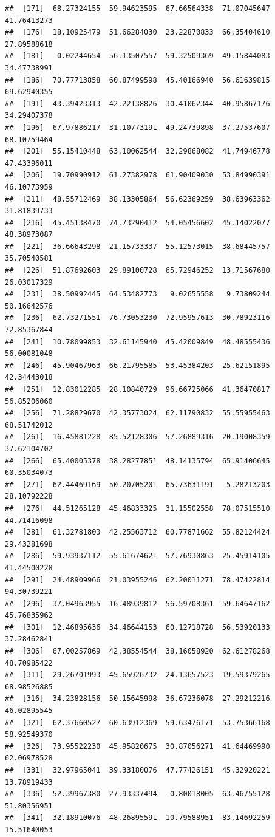 \documentclass[
]{article}
\begin{document}
\begin{verbatim}
##  [171]  68.27324155  59.94623595  67.66564338  71.07045647  41.76413273
##  [176]  18.10925479  51.66284030  23.22870833  66.35404610  27.89588618
##  [181]   0.02244654  56.13507557  59.32509369  49.15844083  34.47738991
##  [186]  70.77713858  60.87499598  45.40166940  56.61639815  69.62940355
##  [191]  43.39423313  42.22138826  30.41062344  40.95867176  34.29407378
##  [196]  67.97886217  31.10773191  49.24739898  37.27537607  68.10759464
##  [201]  55.15410448  63.10062544  32.29868082  41.74946778  47.43396011
##  [206]  19.70990912  61.27382978  61.90409030  53.84990391  46.10773959
##  [211]  48.55712469  38.13305864  56.62369259  38.63963362  31.81839733
##  [216]  45.45138470  74.73290412  54.05456602  45.14022077  48.38973087
##  [221]  36.66643298  21.15733337  55.12573015  38.68445757  35.70540581
##  [226]  51.87692603  29.89100728  65.72946252  13.71567680  26.03017329
##  [231]  38.50992445  64.53482773   9.02655558   9.73809244  50.16642576
##  [236]  62.73271551  76.73053230  72.95957613  30.78923116  72.85367844
##  [241]  10.78099853  32.61145940  45.42009849  48.48555436  56.00081048
##  [246]  45.90467963  66.21795585  53.45384203  25.62151895  42.34443018
##  [251]  12.83012285  28.10840729  96.66725066  41.36470817  56.85206060
##  [256]  71.28829670  42.35773024  62.11790832  55.55955463  68.51742012
##  [261]  16.45881228  85.52128306  57.26889316  20.19008359  37.62104702
##  [266]  65.40005378  38.28277851  48.14135794  65.91406645  60.35034073
##  [271]  62.44469169  50.20705201  65.73631191   5.28213203  28.10792228
##  [276]  44.51265128  45.46833325  31.15502558  78.07515510  44.71416098
##  [281]  61.32781803  42.25563712  60.77871662  55.82124424  29.43281698
##  [286]  59.93937112  55.61674621  57.76930863  25.45914105  41.44500228
##  [291]  24.48909966  21.03955246  62.20011271  78.47422814  94.30739221
##  [296]  37.04963955  16.48939812  56.59708361  59.64647162  45.76835962
##  [301]  12.46895636  34.46644153  60.12718728  56.53920133  37.28462841
##  [306]  67.00257869  42.38554544  38.16058920  62.61278268  48.70985422
##  [311]  29.26701993  45.65926732  24.13657523  19.59379265  68.98526885
##  [316]  34.23828156  50.15645998  36.67236078  27.29212216  46.02895545
##  [321]  62.37660527  60.63912369  59.63476171  53.75366168  58.92549370
##  [326]  73.95522230  45.95820675  30.87056271  41.64469990  62.06978528
##  [331]  32.97965041  39.33180076  47.77426151  45.32920221  13.78919433
##  [336]  52.39967380  27.93337494  -0.80018005  63.46755128  51.80356951
##  [341]  32.18910076  48.26895591  10.79588951  83.14692259  15.51640053

\end{verbatim}
\end{document}
